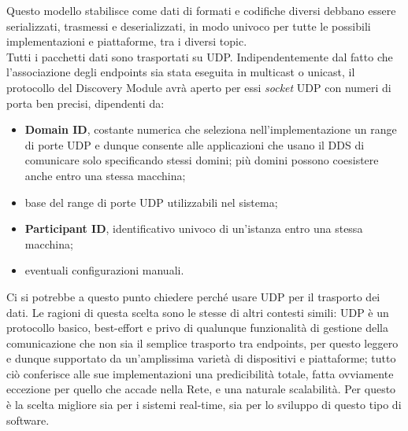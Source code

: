 \indent Questo modello stabilisce come dati di formati e codifiche diversi debbano essere serializzati, trasmessi e deserializzati, in modo univoco per tutte le possibili implementazioni e piattaforme, tra i diversi topic.\\
Tutti i pacchetti dati sono trasportati su UDP. Indipendentemente dal fatto che l’associazione degli endpoints sia stata eseguita in multicast o unicast, il protocollo del Discovery Module avrà aperto per essi \emph{socket} UDP con numeri di porta ben precisi, dipendenti da:
\begin{itemize}
    \item \textbf{Domain ID}, costante numerica che seleziona nell'implementazione un range di porte UDP e dunque consente alle applicazioni che usano il DDS di comunicare solo specificando stessi domini; più domini possono coesistere anche entro una stessa macchina;
    \item base del range di porte UDP utilizzabili nel sistema;
    \item \textbf{Participant ID}, identificativo univoco di un'istanza entro una stessa macchina;
    \item eventuali configurazioni manuali.
\end{itemize}
Ci si potrebbe a questo punto chiedere perché usare UDP per il trasporto dei dati. Le ragioni di questa scelta sono le stesse di altri contesti simili: UDP è un protocollo basico, best-effort e privo di qualunque funzionalità di gestione della comunicazione che non sia il semplice trasporto tra endpoints, per questo leggero e dunque supportato da un'amplissima varietà di dispositivi e piattaforme; tutto ciò conferisce alle sue implementazioni una predicibilità totale, fatta ovviamente eccezione per quello che accade nella Rete, e una naturale scalabilità. Per questo è la scelta migliore sia per i sistemi real-time, sia per lo sviluppo di questo tipo di software.\newpage

